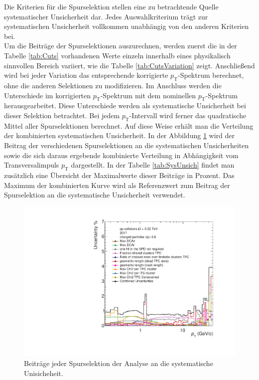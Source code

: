\documentclass[12pt,a4paper]{report}
\begin{document}
\vspace{-1em}
Die Kriterien für die Spurselektion stellen eine zu betrachtende Quelle systematischer Unsicherheit dar. Jedes Auswahlkriterium trägt zur systematischen Unsicherheit vollkommen unabhängig von den anderen Kriterien bei.\\
Um die Beiträge der Spurselektionen auszurechnen, werden zuerst die in der Tabelle \ref{tab:Cuts} vorhandenen Werte einzeln innerhalb eines physikalisch sinnvollen Bereich variiert, wie die Tabelle \ref{tab:CutsVariation} zeigt. Anschließend wird bei jeder Variation das entsprechende korrigierte $p_{\mathrm{T}}$-Spektrum berechnet, ohne die anderen Selektionen zu modifizieren. Im Anschluss werden die Unterschiede im korrigierten $p_{\mathrm{T}}$-Spektrum mit dem nominellen $p_{\mathrm{T}}$-Spektrum herausgearbeitet. Diese Unterschiede werden als systematische Unsicherheit bei dieser Selektion betrachtet. Bei jedem $p_{\mathrm{T}}$-Intervall wird ferner das quadratische Mittel aller Spurselektionen berechnet. Auf diese Weise erhält man die Verteilung der kombinierten systematischen Unsicherheit. In der Abbildung \ref{SysUncTrack} wird der Beitrag der verschiedenen Spurselektionen an die systematischen Unsicherheiten sowie die sich daraus ergebende kombinierte Verteilung in Abhängigkeit vom Transversalimpuls $p_{\mathrm{T}}$ dargestellt. In der Tabelle \ref{tab:SysUnsich} findet man zusätzlich eine Übersicht der Maximalwerte dieser Beiträge in Prozent. Das Maximum der kombinierten Kurve wird als Referenzwert zum Beitrag der Spurselektion an die systematische Unsicherheit verwendet.
\begin{figure}[tb!]
\centering
\includegraphics[width=12.5cm]{Plots/SySUncTrack.pdf}  
\caption{Beiträge jeder Spurselektion der Analyse an die systematische Unisicheheit.}
\label{SysUncTrack}
\end{figure}
\end{document}
